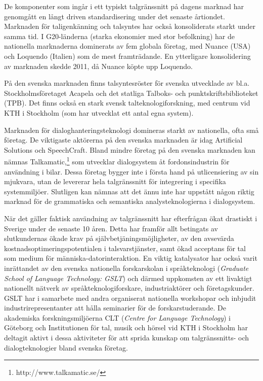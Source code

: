 \begin{multicols}{2}
De komponenter som ingår i ett typiskt talgränssnitt på dagens marknad
har genomgått en långt driven standardisering under det senaste
årtiondet. Marknaden för taligenkänning och talsyntes har också
konsoliderats starkt under samma tid. I G20-länderna (starka ekonomier
med stor befolkning) har de nationella marknaderna dominerats av fem
globala företag, med Nuance (USA) och Loquendo (Italien) som de mest
framträdande. En ytterligare konsolidering av marknaden skedde 2011,
då Nuance köpte upp Loquendo.

På den svenska marknaden finns talsyntesröster för svenska utvecklade
av bl.a. Stockholmsföretaget Acapela och det statliga Talboks- och
punktskriftsbiblioteket (TPB). Det finns också en stark svensk
tal\-tekno\-logi\-forsk\-ning, med centrum vid KTH i Stockholm (som
har utvecklat ett antal egna system).

Marknaden för dialoghanteringsteknologi domineras starkt av
nationella, ofta små företag. De viktigaste aktörerna på den svenska
marknaden är idag Artificial Solutions och SpeechCraft. Bland mindre
företag på den svenska marknaden kan nämnas
Talkamatic,\footnote{http://www.talkamatic.se/} som utvecklar
dialogsystem åt fordonsindustrin för användning i bilar. Dessa företag
bygger inte i första hand på utlicensiering av sin mjukvara, utan de
levererar hela talgränssnitt för integrering i specifika
systemmiljöer. Slutligen kan nämnas att det ännu inte har uppstått
någon riktig marknad för de grammatiska och semantiska
analysteknologierna i dialogsystem.

När det gäller faktisk användning av talgränssnitt har efterfrågan
ökat drastiskt i Sverige under de senaste 10 åren. Detta har framför
allt betingats av slutkundernas ökade krav på
själv\-be\-tjän\-ings\-möj\-lig\-het\-er, av den avsevärda
kost\-nads\-opti\-mer\-ings\-poten\-tial\-en i talsvarstjänster, samt
ökad acceptans för tal som medium för människa-datorinteraktion. En
viktig katalysator har också varit inrättandet av den svenska
nationella forskarskolan i språkteknologi (\emph{Graduate School of
  Language Technology: GSLT}) och därmed uppkomsten av ett livaktigt
nationellt nätverk av språkteknologiforskare, industriaktörer och
företagskunder. GSLT har i samarbete med andra organiserat nationella
work\-shop\-ar och inbjudit industrirepresentanter att hålla seminarier
för de forskarstuderande. De akademiska forskningsmiljöerna CLT
(\emph{Centre for Language Technology}) i Göteborg och Institutionen
för tal, musik och hörsel vid KTH i Stockholm har deltagit aktivt i
dessa aktiviteter för att sprida kunskap om talgränssnitts- och
dialogteknologier bland svenska företag.


\end{multicols}

